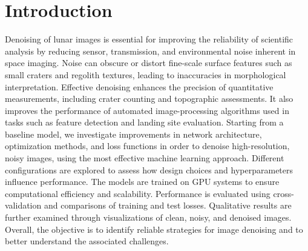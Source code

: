 \documentclass[a4paper,10pt]{article}
\begin{document}

% 
 
\setcounter{page}{1}
\section{Introduction}
Denoising of lunar images is essential for improving the reliability of scientific analysis by reducing sensor, transmission, and environmental noise inherent in space imaging. Noise can obscure or distort fine-scale surface features such as small craters and regolith textures, leading to inaccuracies in morphological interpretation. Effective denoising enhances the precision of quantitative measurements, including crater counting and topographic assessments. It also improves the performance of automated image-processing algorithms used in tasks such as feature detection and landing site evaluation.
Starting from a baseline model, we investigate improvements in network architecture, optimization methods, and loss functions in order to denoise high-resolution, noisy images, using the most effective machine learning approach. Different configurations are explored to assess how design choices and hyperparameters influence performance. The models are trained on GPU systems to ensure computational efficiency and scalability. Performance is evaluated using cross-validation and comparisons of training and test losses. Qualitative results are further examined through visualizations of clean, noisy, and denoised images. Overall, the objective is to identify reliable strategies for image denoising and to better understand the associated challenges.

\end{document}
